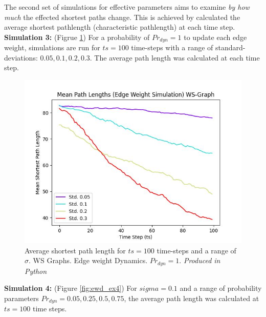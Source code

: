 \documentclass[
	a4paper, %
	10pt, %
	unnumberedsections, %
	twoside, %
]{LTJournalArticle}
\begin{document}
The second set of simulations for effective parameters aims to examine \emph{by how much} the effected shortest paths change. This is achieved by calculated the average shortest pathlength (characteristic pathlength) at each time step. \\

\textbf{Simulation 3:} (Figrue \ref{fig:ewd_ex3}) For a probability of \(Pr_{dyn} = 1\) to update each edge weight, simulations are run for \(ts = 100\) time-steps with a range of standard-deviations: \(0.05, 0.1, 0.2, 0.3\). The average path length was calculated at each time step. \\

\begin{figure}[H]
	\includegraphics[width=\linewidth]{Figures/ewd/ew1_length_std.jpg}
	\caption{Average shortest path length for \(ts = 100\) time-steps and a range of \(\sigma\). WS Graphs. Edge weight Dynamics. \(Pr_{dyn} = 1\). \emph{Produced in Python}}
	\label{fig:ewd_ex3}
\end{figure}

\textbf{Simulation 4:} (Figure \ref{fig:ewd_ex4}) For \(sigma = 0.1\) and a range of probability parameters \(Pr_{dyn} = 0.05, 0.25, 0.5, 0.75\), the average path length was calculated at \(ts = 100\) time steps. \\
\end{document}
